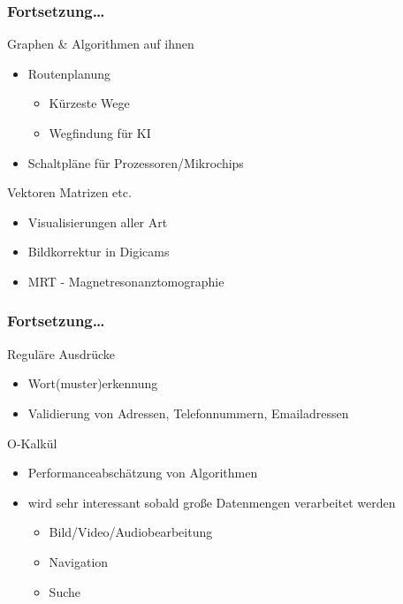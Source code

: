 \begin{frame}
	\frametitle{Fortsetzung\ldots}
	\begin{block}{Graphen \& Algorithmen auf ihnen}
		\begin{itemize}
			\item Routenplanung
			\\ \begin{itemize}
					\item Kürzeste Wege
					\item Wegfindung für KI
				\end{itemize}
			\item Schaltpläne für Prozessoren/Mikrochips
		\end{itemize}
   	\end{block}
  \pause
	\begin{block}{Vektoren Matrizen etc.}
  	\begin{itemize}
			\item Visualisierungen aller Art
			\item Bildkorrektur in Digicams
			\item MRT - Magnetresonanztomographie
		\end{itemize}
	\end{block}
\end{frame}


\begin{frame}
	\frametitle{Fortsetzung\ldots}
	\begin{block}{Reguläre Ausdrücke}
		\begin{itemize}
			\item Wort(muster)erkennung
			\item Validierung von Adressen, Telefonnummern, Emailadressen
		\end{itemize}
   	\end{block}
  \pause
	\begin{block}{O-Kalkül}
  	\begin{itemize}
			\item Performanceabschätzung von Algorithmen
			\item wird sehr interessant sobald große Datenmengen verarbeitet werden
			\\	 		\begin{itemize}
							\item Bild/Video/Audiobearbeitung
							\item Navigation
							\item Suche
						\end{itemize}
		\end{itemize}
	\end{block}
\end{frame}

